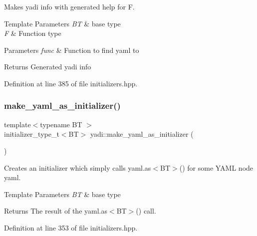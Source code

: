 Makes yadi info with generated help for F. 


\begin{DoxyTemplParams}{Template Parameters}
{\em BT} & base type \\
\hline
{\em F} & Function type \\
\hline
\end{DoxyTemplParams}

\begin{DoxyParams}{Parameters}
{\em func} & Function to find yaml to \\
\hline
\end{DoxyParams}
\begin{DoxyReturn}{Returns}
Generated yadi info 
\end{DoxyReturn}


Definition at line 385 of file initializers.\+hpp.

\mbox{\label{namespaceyadi_aa1f9807cc4def04330e0f1e4dd480c9f}} 
\subsubsection{\texorpdfstring{make\+\_\+yaml\+\_\+as\+\_\+initializer()}{make\_yaml\_as\_initializer()}\hspace{0.1cm}{\footnotesize\ttfamily [1/2]}}
{\footnotesize\ttfamily template$<$typename BT $>$ \\
initializer\+\_\+type\+\_\+t$<$BT$>$ yadi\+::make\+\_\+yaml\+\_\+as\+\_\+initializer (\begin{DoxyParamCaption}{ }\end{DoxyParamCaption})}



Creates an initializer which simply calls yaml.\+as$<$\+B\+T$>$() for some Y\+A\+ML node yaml. 


\begin{DoxyTemplParams}{Template Parameters}
{\em BT} & base type \\
\hline
\end{DoxyTemplParams}
\begin{DoxyReturn}{Returns}
The result of the yaml.\+as$<$\+B\+T$>$() call. 
\end{DoxyReturn}


Definition at line 353 of file initializers.\+hpp.

